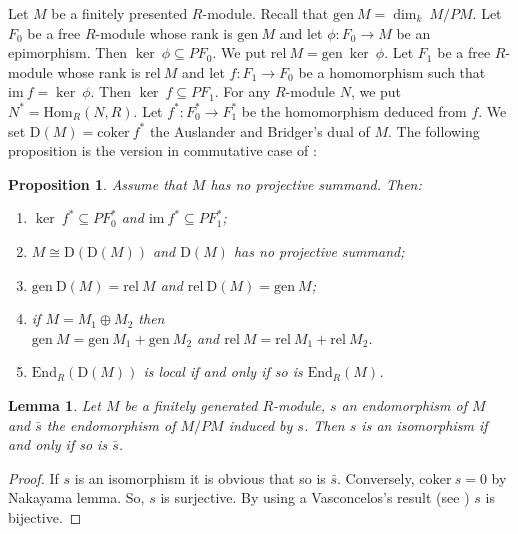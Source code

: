 \documentclass{amsart}
\newtheorem{lemma}[theorem]{Lemma}
\newtheorem{proposition}[theorem]{Proposition}
\begin{document}
Let $M$ be a finitely presented $R$-module. Recall that $\mathrm{gen}\ M=\dim_k\ M/PM$. Let $F_0$ be a free $R$-module whose rank is $\mathrm{gen}\ M$ and let $\phi:F_0\rightarrow M$ be an epimorphism. Then $\ker\ \phi\subseteq PF_0$. We put $\mathrm{rel}\ M=\mathrm{gen}\  \ker\ \phi$. Let $F_1$ be a free  $R$-module whose rank is $\mathrm{rel}\ M$ and let $f:F_1\rightarrow F_0$ be a homomorphism such that $\mathrm{im}\ f=\ker\ \phi$. Then $\ker\ f\subseteq PF_1$. For any $R$-module $N$, we put $N^*=\mathrm{Hom}_R(N,R)$. Let $f^*:F_0^*\rightarrow F_1^*$ be the homomorphism deduced from $f$. We set $\mathrm{D}(M)=\mathrm{coker}\ f^*$ the Auslander and Bridger's dual of $M$. The following proposition is the version in commutative case of \cite[Theorem 2.4]{War75}:
\begin{proposition}
\label{P:AusBrid} Assume that $M$ has no projective summand. Then:
\begin{enumerate}
\item $\ker\ f^*\subseteq PF_0^*$ and $\mathrm{im}\ f^*\subseteq PF_1^*$;
\item $M\cong \mathrm{D}(\mathrm{D}(M))$ and $\mathrm{D}(M)$ has no projective summand;
\item $\mathrm{gen}\ \mathrm{D}(M)=\mathrm{rel}\ M$ and $\mathrm{rel}\ \mathrm{D}(M)=\mathrm{gen}\ M$;
\item if $M=M_1\oplus M_2$ then\\ $\mathrm{gen}\ M=\mathrm{gen}\ M_1 + \mathrm{gen}\ M_2$ and $\mathrm{rel}\ M=\mathrm{rel}\ M_1 + \mathrm{rel}\ M_2$.
\item $\mathrm{End}_R(\mathrm{D}(M))$ is local if and only if so is $\mathrm{End}_R(M)$.
\end{enumerate}
\end{proposition}
\begin{lemma}
\label{L:iso} Let  $M$ be a finitely generated $R$-module, $s$ an endomorphism of $M$ and $\bar{s}$ the endomorphism of $M/PM$ induced by $s$. Then $s$ is an isomorphism if and only if so is $\bar{s}$.
\end{lemma}
\begin{proof}
If $s$ is an isomorphism it is obvious that so is $\bar{s}$. Conversely, $\mathrm{coker}\ s=0$ by Nakayama lemma. So, $s$ is surjective. By using a Vasconcelos's result (see \cite[Theorem V.2.3]{FuSa01}) $s$ is bijective.
\end{proof}
\end{document}
